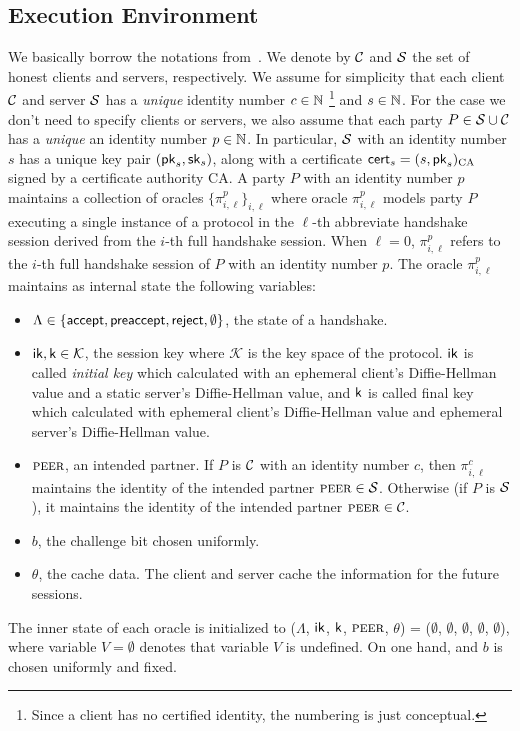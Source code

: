 \subsection{Execution Environment} \label{sec:exec_env_party}
We basically borrow the notations
from~\cite{JKSS12:ACCE,KPW13:SACCE}.
We denote by $\mathcal{C}$ and $\mathcal{S}$ the set of honest
clients and servers, respectively.
We assume for simplicity that each client $\mathcal{C}$
and server $\mathcal{S}$ has a \textit{unique} identity
number $c \in \mathbb{N}$
\footnote{Since a client has no certified identity,
the numbering is just conceptual.}
and $s \in \mathbb{N}$.
For the case we don't need to specify clients or
servers, we also assume that each party
$P \in \mathcal{S} \cup \mathcal{C}$ has a \textit{unique} an
identity number $p \in \mathbb{N}$.
In particular, $\mathcal{S}$ with an identity number $s$ has a unique key pair
$(\mathsf{pk}_s, \mathsf{sk}_s)$, along with a certificate
$\mathsf{cert}_s=(s,\mathsf{pk}_s)_{\text{CA}}$ signed by a certificate
authority CA.
A party $P$ with an identity number $p$ maintains a collection of oracles
$\{\pi^p_{i,\ell }\}_{i,\ell}$ where oracle
$\pi^p_{i, \ell}$ models party $P$ executing a single
instance of a protocol in the $\ell$-th abbreviate
handshake session derived from the $i$-th full
handshake session.
When $\ell=0$, $\pi^p_{i,\ell}$ refers to the $i$-th
full handshake session of $P$ with an identity number $p$.
The oracle $\pi^p_{i, \ell}$ maintains as internal
state the following variables:

\begin{itemize}
 \item{$\Lambda \in \{\mathsf{accept}, \mathsf{preaccept}, \mathsf{reject},
 \emptyset\}$, the state of a handshake.}

 \item{$\mathsf{ik}, \mathsf{k} \in \mathcal{K}$, the session key
 where $\mathcal{K}$ is the key space of the protocol.
 $\mathsf{ik}$ is called \textit{initial key} which calculated with
 an ephemeral client's Diffie-Hellman value and a static
 server's Diffie-Hellman value, and $\mathsf{k}$ is called
 final key which calculated with ephemeral
 client's Diffie-Hellman value and ephemeral server's
 Diffie-Hellman value.}

 \item{$\textsc{peer}$, an intended partner. If $P$ is
 $\mathcal{C}$ with an identity number $c$, then $\pi^c_{i,\ell}$ maintains the
 identity of the intended partner $\textsc{peer} \in \mathcal{S}$.
 Otherwise (if $P$ is $\mathcal{S}$), it maintains
 the identity of the intended partner $\textsc{peer} \in \mathcal{C}$.}

 \item{$b$, the challenge bit chosen uniformly.}

 \item{$\theta$, the cache data. The client and server
 cache the information for the future sessions.}
\end{itemize}
The inner state of each oracle is initialized to
($\Lambda$, $\mathsf{ik}$, $\mathsf{k}$, $\textsc{peer}$, $\theta$) = ($\emptyset$,
$\emptyset$, $\emptyset$, $\emptyset$, $\emptyset$), where
variable $V=\emptyset$ denotes that variable $V$
is undefined.
On one hand, and $b$ is chosen uniformly and fixed.

